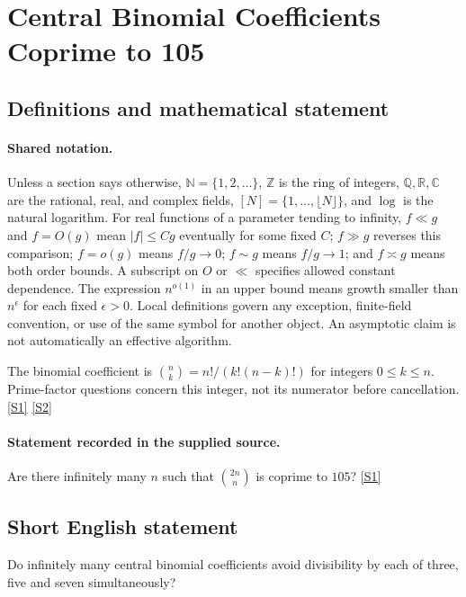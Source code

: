 \documentclass[11pt,a4paper]{article}
\newcommand{\N}{\mathbb{N}}
\newcommand{\Z}{\mathbb{Z}}
\newcommand{\Q}{\mathbb{Q}}
\newcommand{\R}{\mathbb{R}}
\newcommand{\C}{\mathbb{C}}
\newcommand{\sref}[2]{\hyperlink{source:#1:#2}{[S#2]}}
\begin{document}
\section{Central Binomial Coefficients Coprime to 105}\label{statement}


\subsection{Definitions and mathematical statement}

\paragraph{Shared notation.}Unless a section says otherwise, $\N=\{1,2,\ldots\}$,
$\Z$ is the ring of integers, $\Q,\R,\C$ are the rational, real, and complex
fields, $[N]=\{1,\ldots,\lfloor N\rfloor\}$, and $\log$ is the natural
logarithm. For real functions of a parameter tending to infinity,
$f\ll g$ and $f=O(g)$ mean $|f|\leq Cg$ eventually for some fixed $C$;
$f\gg g$ reverses this comparison; $f=o(g)$ means $f/g\to0$;
$f\sim g$ means $f/g\to1$; and $f\asymp g$ means both order bounds.
A subscript on $O$ or $\ll$ specifies allowed constant dependence.
The expression $n^{o(1)}$ in an upper bound means growth smaller than
$n^\epsilon$ for each fixed $\epsilon>0$. Local definitions govern any
exception, finite-field convention, or use of the same symbol for another
object. An asymptotic claim is not automatically an effective algorithm.



The binomial coefficient is $\binom nk=n!/(k!(n-k)!)$ for integers $0\leq k\leq n$. Prime-factor questions concern this integer, not its numerator before cancellation. \sref{statement}{1} \sref{statement}{2}

\paragraph{Statement recorded in the supplied source.}
Are there infinitely many $n$ such that $\binom{2n}{n}$ is coprime to $105$? \sref{statement}{1}

\subsection{Short English statement}

Do infinitely many central binomial coefficients avoid divisibility by each of three, five and seven simultaneously?
\end{document}
